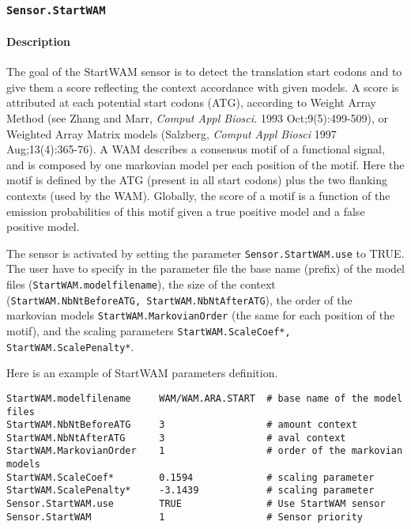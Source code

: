 
\subsubsection{\texttt{Sensor.StartWAM}}

\paragraph{Description}

The goal of the StartWAM sensor is to detect the translation start
codons and to give them a score reflecting the context accordance with
given models. A score is attributed at each potential start codons
(ATG), according to Weight Array Method (see Zhang and Marr, {\em
  Comput Appl Biosci.} 1993 Oct;9(5):499-509), or Weighted Array
Matrix models (Salzberg, {\em Comput Appl Biosci} 1997
Aug;13(4):365-76). A WAM describes a consensus motif of a functional
signal, and is composed by one markovian model per each position of
the motif. Here the motif is defined by the ATG (present in all start
codons) plus the two flanking contexts (used by the WAM).  Globally,
the score of a motif is a function of the emission probabilities of
this motif given a true positive model and a false positive model.

The sensor is activated by setting the parameter
\texttt{Sensor.StartWAM.use} to TRUE.  The user have to specify in
the parameter file the base name (prefix) of the model files
(\texttt{StartWAM.modelfilename}), the size of the context
(\texttt{StartWAM.NbNtBeforeATG, StartWAM.NbNtAfterATG}), the order of
the markovian models \texttt{StartWAM.MarkovianOrder} (the same for
each position of the motif), and the scaling parameters
\texttt{StartWAM.ScaleCoef*, StartWAM.ScalePenalty*}.

Here is an example of StartWAM parameters definition.
\begin{Verbatim}[fontsize=\small]
StartWAM.modelfilename     WAM/WAM.ARA.START  # base name of the model files
StartWAM.NbNtBeforeATG     3                  # amount context
StartWAM.NbNtAfterATG      3                  # aval context
StartWAM.MarkovianOrder    1                  # order of the markovian models
StartWAM.ScaleCoef*        0.1594             # scaling parameter
StartWAM.ScalePenalty*     -3.1439            # scaling parameter
Sensor.StartWAM.use        TRUE               # Use StartWAM sensor
Sensor.StartWAM            1                  # Sensor priority
\end{Verbatim}

